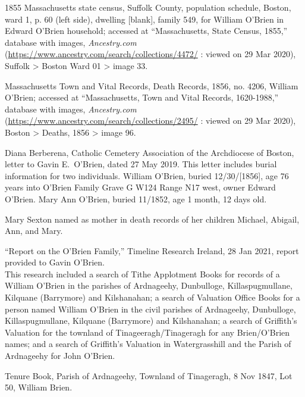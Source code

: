 \begin{thebibliography}{999}
	\raggedright
	\small


1855 Massachusetts state census, Suffolk County, population schedule, Boston, ward 1, p. 60 (left side), dwelling [blank], family 549, for William O'Brien in Edward O'Brien household; accessed at ``Massachusetts, State Census, 1855,'' database with images, \textit{Ancestry.com} (\url{https://www.ancestry.com/search/collections/4472/} : viewed on 29 Mar 2020), Suffolk > Boston Ward 01 > image 33.

Massachusetts Town and Vital Records, Death Records, 1856, no. 4206, William O'Brien; accessed at ``Massachusetts, Town and Vital Records, 1620-1988,'' database with images, \textit{Ancestry.com} (\url{https://www.ancestry.com/search/collections/2495/} : viewed on 29 Mar 2020), Boston > Deaths, 1856 > image 96.

Diana Berberena, Catholic Cemetery Association of the Archdiocese of Boston, letter to Gavin E.\ O'Brien, dated 27 May 2019. This letter includes burial information for two individuals. William O'Brien, buried 12/30/[1856], age 76 years into O'Brien Family Grave G W124 Range N17 west, owner Edward O'Brien. Mary Ann O'Brien, buried 11/1852, age 1 month, 12 days old.

Mary Sexton named as mother in death records of her children Michael, Abigail, Ann, and Mary.

``Report on the O'Brien Family,'' Timeline Research Ireland, 28 Jan 2021, report provided to Gavin O'Brien.\\
This research included a search of Tithe Applotment Books for records of a William O'Brien in the parishes of Ardnageehy, Dunbulloge, Killaspugmullane, Kilquane (Barrymore) and Kilshanahan; a search of Valuation Office Books for a person named William O'Brien in the civil parishes of Ardnageehy, Dunbulloge, Killaspugmullane, Kilquane (Barrymore) and Kilshanahan; a search of Griffith's Valuation for the townland of Tinageeragh/Tinageragh for any Brien/O'Brien names; and a search of Griffith's Valuation in Watergrasshill and the Parish of Ardnageehy for John O'Brien.

Tenure Book, Parish of Ardnageehy, Townland of Tinageragh, 8 Nov 1847, Lot 50, William Brien.


\end{thebibliography}
